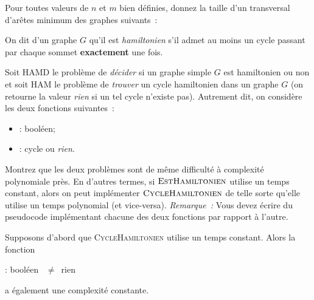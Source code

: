 \documentclass[12pt,addpoints]{exam}
\begin{document}
\begin{questions}
Pour toutes valeurs de $n$ et $m$ bien définies, donnez la taille d'un transversal d'arêtes minimum des graphes suivants~:

\question
On dit d'un graphe $G$ qu'il est \emph{hamiltonien} s'il admet au moins un cycle passant par chaque sommet \textbf{exactement} une fois.

Soit HAMD le problème de \emph{décider} si un graphe simple $G$ est hamiltonien ou non et soit HAM le problème de \emph{trouver} un cycle hamiltonien dans un graphe $G$ (on retourne la valeur \emph{rien} si un tel cycle n'existe pas). Autrement dit, on considère les deux fonctions suivantes~:
\begin{itemize}
  \item {} : booléen;
  \item {} : cycle ou \emph{rien}.
\end{itemize}
Montrez que les deux problèmes sont de même difficulté à complexité polynomiale près. En d'autres termes, si $\textsc{EstHamiltonien}$ utilise un temps constant, alors on peut implémenter $\textsc{CycleHamiltonien}$ de telle sorte qu'elle utilise un temps polynomial (et vice-versa). \emph{Remarque~:} Vous devez écrire du pseudocode implémentant chacune des deux fonctions par rapport à l'autre.
\begin{solution}
Supposons d'abord que \textsc{CycleHamiltonien} utilise un temps constant. Alors la fonction
\begin{algorithmic}[1]
   : booléen
    \State \Return {}~$\neq$~rien
  \EndFunction
\end{algorithmic}
a également une complexité constante.


\end{solution}
\end{questions}
\end{document}
